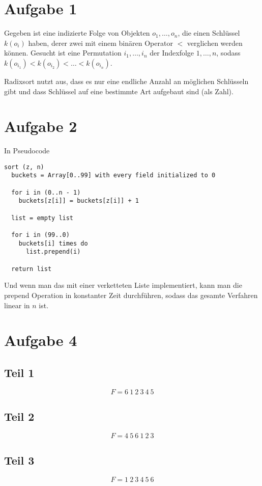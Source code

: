 \documentclass[10pt,a4paper]{article}
\begin{document}
\section{Aufgabe 1}
Gegeben ist eine indizierte Folge von Objekten $o_{1}, \dots, o_{n}$, die einen Schlüssel $k(o_{i})$ haben, derer zwei mit einem binären Operator $<$ verglichen werden können.
Gesucht ist eine Permutation $i_{1}, \dots, i_{n}$ der Indexfolge $1, \dots, n$, sodass $k(o_{i_{1}}) < k(o_{i_{2}}) < \dots < k(o_{i_{n}})$.

Radixsort nutzt aus, dass es nur eine endliche Anzahl an möglichen Schlüsseln gibt und dass Schlüssel auf eine bestimmte Art aufgebaut sind (als Zahl).

\section{Aufgabe 2}
In Pseudocode
\begin{lstlisting}
sort (z, n)
  buckets = Array[0..99] with every field initialized to 0

  for i in (0..n - 1)
    buckets[z[i]] = buckets[z[i]] + 1

  list = empty list

  for i in (99..0)
    buckets[i] times do
      list.prepend(i)

  return list
\end{lstlisting}
Und wenn man das mit einer verketteten Liste implementiert, kann man die prepend Operation in konstanter Zeit durchführen, sodass das gesamte Verfahren linear in $n$ ist.

\section{Aufgabe 4}

\subsection{Teil 1}
\begin{equation}
  F = 6\ 1\ 2\ 3\ 4\ 5
\end{equation}

\subsection{Teil 2}
\begin{equation}
  F = 4\ 5\ 6\ 1\ 2\ 3
\end{equation}

\subsection{Teil 3}
\begin{equation}
  F = 1\ 2\ 3\ 4\ 5\ 6
\end{equation}
\end{document}
